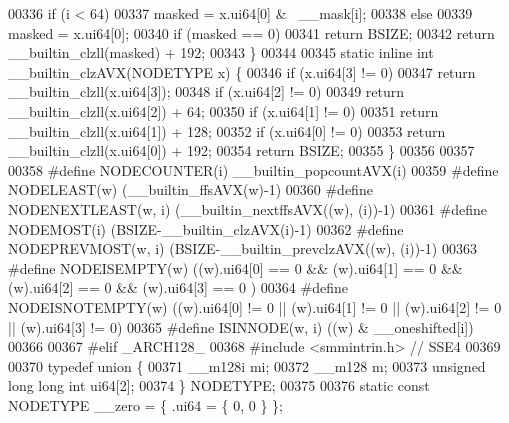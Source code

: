 \begin{DoxyCode}
00336         \textcolor{keywordflow}{if} (i < 64)
00337                 masked = x.ui64[0] & ~\_\_mask[i];
00338         \textcolor{keywordflow}{else}
00339                 masked = x.ui64[0];
00340         \textcolor{keywordflow}{if} (masked == 0)
00341                 \textcolor{keywordflow}{return} BSIZE;
00342         \textcolor{keywordflow}{return} \_\_builtin\_clzll(masked) + 192;
00343 \}
00344 
00345 \textcolor{keyword}{static} \textcolor{keyword}{inline} \textcolor{keywordtype}{int} \_\_builtin\_clzAVX(NODETYPE x) \{
00346         \textcolor{keywordflow}{if} (x.ui64[3] != 0)
00347                 \textcolor{keywordflow}{return} \_\_builtin\_clzll(x.ui64[3]);
00348         \textcolor{keywordflow}{if} (x.ui64[2] != 0)
00349                 \textcolor{keywordflow}{return} \_\_builtin\_clzll(x.ui64[2]) + 64;
00350         \textcolor{keywordflow}{if} (x.ui64[1] != 0)
00351                 \textcolor{keywordflow}{return} \_\_builtin\_clzll(x.ui64[1]) + 128;
00352         \textcolor{keywordflow}{if} (x.ui64[0] != 0)
00353                 \textcolor{keywordflow}{return} \_\_builtin\_clzll(x.ui64[0]) + 192;
00354         \textcolor{keywordflow}{return} BSIZE;
00355 \}
00356 
00357 
00358 \textcolor{preprocessor}{#define NODECOUNTER(i) \_\_builtin\_popcountAVX(i)}
00359 \textcolor{preprocessor}{#define NODELEAST(w) (\_\_builtin\_ffsAVX(w)-1)}
00360 \textcolor{preprocessor}{#define NODENEXTLEAST(w, i) (\_\_builtin\_nextffsAVX((w), (i))-1)}
00361 \textcolor{preprocessor}{#define NODEMOST(i) (BSIZE-\_\_builtin\_clzAVX(i)-1)}
00362 \textcolor{preprocessor}{#define NODEPREVMOST(w, i) (BSIZE-\_\_builtin\_prevclzAVX((w), (i))-1)}
00363 \textcolor{preprocessor}{#define NODEISEMPTY(w) ((w).ui64[0] == 0 && (w).ui64[1] == 0 && (w).ui64[2] == 0  && (w).ui64[3] == 0 )}
00364 \textcolor{preprocessor}{#define NODEISNOTEMPTY(w) ((w).ui64[0] != 0 || (w).ui64[1] != 0 || (w).ui64[2] != 0 || (w).ui64[3] != 0)}
00365 \textcolor{preprocessor}{#define ISINNODE(w, i) ((w) & \_\_oneshifted[i])                                                  }
00366 \textcolor{preprocessor}{}
00367 \textcolor{preprocessor}{#elif \_ARCH128\_}
00368 \textcolor{preprocessor}{#include <smmintrin.h>} \textcolor{comment}{// SSE4}
00369 
00370 \textcolor{keyword}{typedef} \textcolor{keyword}{union }\{
00371     \_\_m128i mi;
00372     \_\_m128 m;
00373     \textcolor{keywordtype}{unsigned} \textcolor{keywordtype}{long} \textcolor{keywordtype}{long} \textcolor{keywordtype}{int} ui64[2];
00374 \} NODETYPE; 
00375 
00376 \textcolor{keyword}{static} \textcolor{keyword}{const} NODETYPE \_\_zero = \{ .ui64 = \{ 0, 0 \} \};

\end{DoxyCode}
